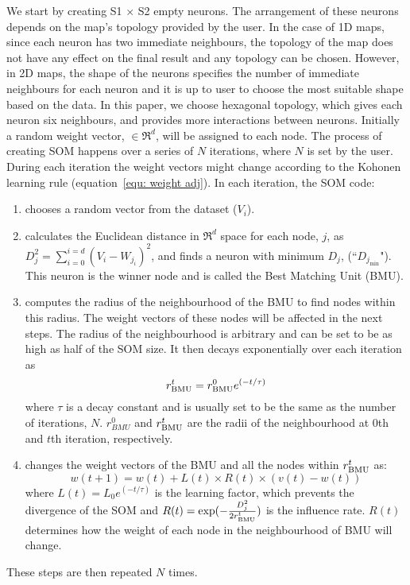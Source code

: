      We start by creating S1 $\times$ S2 empty neurons. 
     The arrangement of these neurons depends on the map's topology provided by the user. 
     In the case of 1D maps, since each neuron has two immediate neighbours, the topology of the map does not have any effect on the final result and any topology can be chosen.
     However, in 2D maps, the shape of the neurons specifies the number of immediate neighbours for each neuron and it is up to user to choose the most suitable shape based on the data.
     In this paper, we choose hexagonal topology, which gives each neuron six neighbours, and provides more interactions between neurons.
     Initially a random weight vector,  $\in \Re^d$, will be assigned to each node.
     The process of creating SOM happens over a series of $N$ iterations, where $N$ is set by the user. 
     During each iteration the weight vectors might change according to the Kohonen learning rule (equation~\ref{equ: weight adj}). 
      In each iteration, the SOM code:
     \begin{enumerate}
        \item chooses a random vector from the dataset ($V_i$).
        \item calculates the Euclidean distance in $\Re^d$ space for each node, $j$, as  $D_j^2= \sum_{i=0}^{i=d} (V_i - W_{j_i})^2$, and finds a neuron with minimum $D_j$, (``$D_{j_{\min}}$"). This neuron is the winner node and is called the Best Matching Unit (BMU). 
        \item  computes the radius of the neighbourhood of the BMU to find nodes within this radius. The weight vectors of these nodes will be affected in the next steps. The radius of the neighbourhood is arbitrary and can be set to be as high as half of the SOM size. It then decays exponentially over each iteration as
        \begin{equation}
            r^t_{\rm BMU} = r^0_{\rm BMU}e^{(-t/\tau)}
        \end{equation}
        where $\tau$ is a decay constant and is usually set to be the same as the number of iterations, $N$. $r^0_{BMU}$ and $r^t_{\rm BMU}$ are the radii of the neighbourhood at 0th and $t$th iteration, respectively. 
        \item changes the weight vectors of the BMU and all the nodes within $r^t_{\rm BMU}$ as:
        \begin{equation}
            \label{equ: weight adj}
            w(t+1)=w(t)+L(t) \times R(t) \times(v(t)-w(t))
        \end{equation}
        where $L(t) = L_0 e^{(-t/\tau)}$ is the learning factor, which prevents the divergence of the SOM and $R(t)=\exp(-\frac{D_j^2}{2r^t_{\rm BMU}})$ is the influence rate. $R(t)$ determines how the weight of each node in the neighbourhood of BMU will change.
     \end{enumerate}
     These steps are then repeated $N$ times.
     
